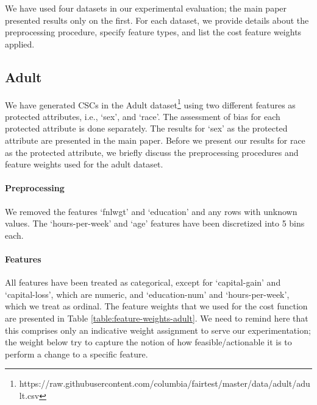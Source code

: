 \documentclass{article}
\begin{document}
We have used four datasets in our experimental evaluation; the main paper presented results only on the first.
For each dataset, we provide details about the preprocessing procedure, specify feature types, and list the cost feature weights applied.

 




\subsection{Adult}
We have generated CSCs in the Adult dataset\footnote{https://raw.githubusercontent.com/columbia/fairtest/master/data/adult/adult.csv} using two different features as protected attributes, i.e., `sex', and `race'. The assessment of bias for each protected attribute is done separately. The results for `sex' as the protected attribute are presented in the main paper. Before we present our results for race as the protected attribute, we briefly discuss the preprocessing procedures and feature weights used for the adult dataset.   
\paragraph{Preprocessing} We removed the features `fnlwgt' and `education' and any rows with unknown values. The `hours-per-week' and `age' features have been discretized into 5 bins each.

\paragraph{Features} All features have been treated as categorical, except for `capital-gain' and `capital-loss', which are numeric, and `education-num' and `hours-per-week', which we treat as ordinal. The feature weights that we used for the cost function are presented in Table \ref{table:feature-weights-adult}. We need to remind here that this comprises only an indicative weight assignment to serve our experimentation; the weight below try to capture the notion of how feasible/actionable it is to perform a change to a specific feature.
\end{document}
